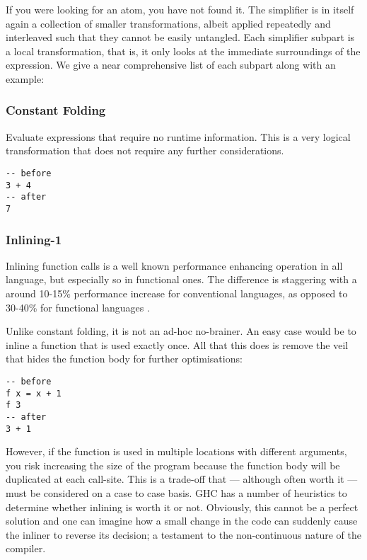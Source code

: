 If you were looking for an atom, you have not found it. The simplifier is in itself again a collection of smaller transformations,
albeit applied repeatedly and interleaved such that they cannot be easily untangled. Each simplifier subpart is a local transformation,
that is, it only looks at the immediate surroundings of the expression. We give a near comprehensive list of each subpart along with an example:

\subsubsection{Constant Folding}
Evaluate expressions that require no runtime information. This is a very logical transformation that does not
require any further considerations.

\begin{listing}[H]
\begin{verbatim}
-- before
3 + 4
-- after
7
\end{verbatim}
\end{listing}

\subsubsection{Inlining-1}

Inlining function calls is a well known performance enhancing operation in all language, but especially so in functional ones.
The difference is staggering with a around 10-15\% performance increase for conventional languages, as opposed to
30-40\% for functional languages \cite{haskell_optimisations_1997}.

Unlike constant folding, it is not an ad-hoc no-brainer. An easy case would be to inline a function that is
used exactly once. All that this does is remove the veil that hides the function body for further optimisations:

\begin{listing}[H]
\begin{verbatim}
-- before
f x = x + 1
f 3
-- after
3 + 1
\end{verbatim}
\end{listing}

However, if the function is used in multiple locations with different arguments, you risk increasing the size of the program
because the function body will be duplicated at each call-site. This is a trade-off that --- although often worth it --- must be
considered on a case to case basis. GHC has a number of heuristics to determine whether inlining is worth it or not. Obviously,
this cannot be a perfect solution and one can imagine how a small change in the code can suddenly cause the inliner to reverse
its decision; a testament to the non-continuous nature of the compiler.


